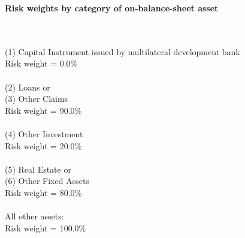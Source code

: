 \documentclass{article}
\begin{document}
\setlength{\parindent}{0em}
\begin{center}{\bf Risk weights by category of on-balance-sheet asset}\end{center}
~\\
~\\

(1) Capital Instrument issued by multilateral development bank \\
Risk weight = 0.0\%\\

~\\
(2) Loans or \\
(3) Other Claims \\
Risk weight = 90.0\%\\

~\\
(4) Other Investment\\
Risk weight = 20.0\%\\

~\\
(5) Real Estate or \\
(6) Other Fixed Assets\\
Risk weight = 80.0\%\\

~\\
All other assets:\\
Risk weight = 100.0\%\\

~\\
\end{document}
